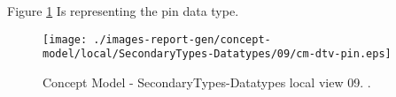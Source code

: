Figure \ref{fig:lu.uni.lassy.excalibur.group09.spec-CM-view-local-SecondaryTypes-Datatypes-09} Is representing the pin data type.



\begin{figure}[htbp] 
\label{fig:lu.uni.lassy.excalibur.group09.spec-CM}
\begin{center}
\texttt{[image: ./images-report-gen/concept-model/local/SecondaryTypes-Datatypes/09/cm-dtv-pin.eps]}
\end{center}
\caption[Concept Model - SecondaryTypes-Datatypes local view 09 - ]{Concept Model - SecondaryTypes-Datatypes local view 09. .}
\label{fig:lu.uni.lassy.excalibur.group09.spec-CM-view-local-SecondaryTypes-Datatypes-09}
\end{figure}
\vspace{0.5cm} 

